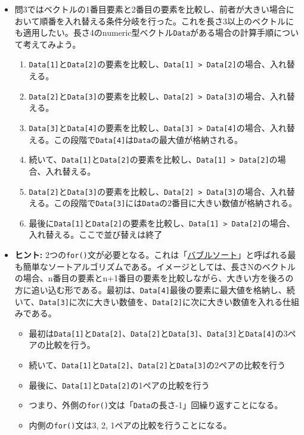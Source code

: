\documentclass[
  a4paper,
  pandoc,
  ja=standard,
  jafont=haranoaji]{bxjsbook}
\providecommand{\tightlist}{%
  \setlength{\itemsep}{0pt}\setlength{\parskip}{0pt}}
\begin{document}
\begin{itemize}
\tightlist
\item
  問3ではベクトルの1番目要素と2番目の要素を比較し、前者が大きい場合において順番を入れ替える条件分岐を行った。これを長さ3以上のベクトルにも適用したい。長さ4のnumeric型ベクトル\texttt{Data}がある場合の計算手順について考えてみよう。

  \begin{enumerate}
  \def\labelenumi{\arabic{enumi}.}
  \tightlist
  \item
    \texttt{Data{[}1{]}}と\texttt{Data{[}2{]}}の要素を比較し、\texttt{Data{[}1{]}\ \textgreater{}\ Data{[}2{]}}の場合、入れ替える。
  \item
    \texttt{Data{[}2{]}}と\texttt{Data{[}3{]}}の要素を比較し、\texttt{Data{[}2{]}\ \textgreater{}\ Data{[}3{]}}の場合、入れ替える。
  \item
    \texttt{Data{[}3{]}}と\texttt{Data{[}4{]}}の要素を比較し、\texttt{Data{[}3{]}\ \textgreater{}\ Data{[}4{]}}の場合、入れ替える。この段階で\texttt{Data{[}4{]}}は\texttt{Data}の最大値が格納される。
  \item
    続いて、\texttt{Data{[}1{]}}と\texttt{Data{[}2{]}}の要素を比較し、\texttt{Data{[}1{]}\ \textgreater{}\ Data{[}2{]}}の場合、入れ替える。
  \item
    \texttt{Data{[}2{]}}と\texttt{Data{[}3{]}}の要素を比較し、\texttt{Data{[}2{]}\ \textgreater{}\ Data{[}3{]}}の場合、入れ替える。この段階で\texttt{Data{[}3{]}}には\texttt{Data}の2番目に大きい数値が格納される。
  \item
    最後に\texttt{Data{[}1{]}}と\texttt{Data{[}2{]}}の要素を比較し、\texttt{Data{[}1{]}\ \textgreater{}\ Data{[}2{]}}の場合、入れ替える。ここで並び替えは終了
  \end{enumerate}
\item
  \textbf{ヒント:}
  2つの\texttt{for()}文が必要となる。これは「\href{https://ja.wikipedia.org/wiki/バブルソート}{バブルソート}」と呼ばれる最も簡単なソートアルゴリズムである。イメージとしては、長さNのベクトルの場合、n番目の要素とn+1番目の要素を比較しながら、大きい方を後ろの方に追い込む形である。最初は、\texttt{Data{[}4{]}}最後の要素に最大値を格納し、続いて、\texttt{Data{[}3{]}}に次に大きい数値を、\texttt{Data{[}2{]}}に次に大きい数値を入れる仕組みである。

  \begin{itemize}
  \tightlist
  \item
    最初は\texttt{Data{[}1{]}}と\texttt{Data{[}2{]}}、\texttt{Data{[}2{]}}と\texttt{Data{[}3{]}}、\texttt{Data{[}3{]}}と\texttt{Data{[}4{]}}の3ペアの比較を行う。
  \item
    続いて、\texttt{Data{[}1{]}}と\texttt{Data{[}2{]}}、\texttt{Data{[}2{]}}と\texttt{Data{[}3{]}}の2ペアの比較を行う
  \item
    最後に、\texttt{Data{[}1{]}}と\texttt{Data{[}2{]}}の1ペアの比較を行う
  \item
    つまり、外側の\texttt{for()}文は「\texttt{Data}の長さ-1」回繰り返すことになる。
  \item
    内側の\texttt{for()}文は3, 2, 1ペアの比較を行うことになる。
  \end{itemize}
\end{itemize}
\end{document}
